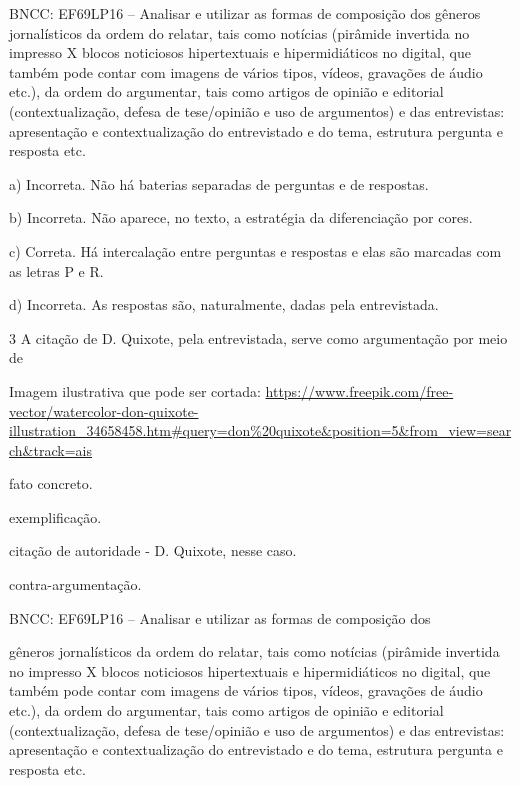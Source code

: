 BNCC: EF69LP16 -- Analisar e utilizar as formas de composição dos
gêneros jornalísticos da ordem do relatar, tais como notícias (pirâmide
invertida no impresso X blocos noticiosos hipertextuais e
hipermidiáticos no digital, que também pode contar com imagens de vários
tipos, vídeos, gravações de áudio etc.), da ordem do argumentar, tais
como artigos de opinião e editorial (contextualização, defesa de
tese/opinião e uso de argumentos) e das entrevistas: apresentação e
contextualização do entrevistado e do tema, estrutura pergunta e
resposta etc.

a) Incorreta. Não há baterias separadas de perguntas e de respostas.

b) Incorreta. Não aparece, no texto, a estratégia da diferenciação por
cores.

c) Correta. Há intercalação entre perguntas e respostas e elas são
marcadas com as letras P e R.

d) Incorreta. As respostas são, naturalmente, dadas pela entrevistada.

\num{3} A citação de D. Quixote, pela entrevistada, serve como
argumentação por meio de

Imagem ilustrativa que pode ser cortada:
\url{https://www.freepik.com/free-vector/watercolor-don-quixote-illustration_34658458.htm\#query=don\%20quixote\&position=5\&from_view=search\&track=ais}

\begin{escolha}
\item fato concreto.

\item exemplificação.

\item citação de autoridade - D. Quixote, nesse caso.

\item contra-argumentação.

\end{escolha}BNCC: EF69LP16 -- Analisar e utilizar as formas de composição dos

gêneros jornalísticos da ordem do relatar, tais como notícias (pirâmide
invertida no impresso X blocos noticiosos hipertextuais e
hipermidiáticos no digital, que também pode contar com imagens de vários
tipos, vídeos, gravações de áudio etc.), da ordem do argumentar, tais
como artigos de opinião e editorial (contextualização, defesa de
tese/opinião e uso de argumentos) e das entrevistas: apresentação e
contextualização do entrevistado e do tema, estrutura pergunta e
resposta etc.


